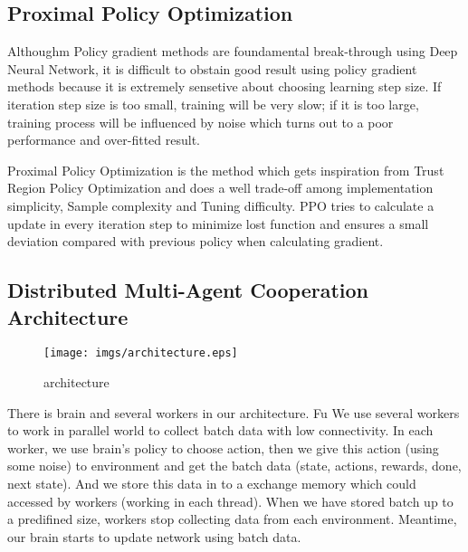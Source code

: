 \documentclass[11pt,twocolumn]{jarticle} %
\begin{document}
\subsection{Proximal Policy Optimization}
Althoughm Policy gradient methods are foundamental break-through using Deep Neural Network, it is difficult to obstain good result using policy gradient methods because it is extremely sensetive about choosing learning step size. If iteration step size is too small, training will be very slow; if it is too large, training process will be influenced by noise which turns out to a poor performance and over-fitted result. \par
Proximal Policy Optimization is the method which gets inspiration from Trust Region Policy Optimization and does a well trade-off among implementation simplicity, Sample complexity and Tuning difficulty. PPO tries to calculate a update in every iteration step to minimize lost function and ensures a small deviation compared with previous policy when calculating gradient.




\subsection{Distributed Multi-Agent Cooperation Architecture}
\begin{figure*}[t]
 \begin{center}
  \texttt{[image: imgs/architecture.eps]}
  \caption{architecture}
  \label{fig:architecture}
 \end{center}
\end{figure*}


There is brain and several workers in our architecture. Fu We use several workers to work in parallel world to collect batch data with low connectivity. In each worker,  we use brain's policy to choose action, then we give this action (using some noise) to environment and get the batch data (state, actions, rewards, done, next state). And we store this data in to a exchange memory which could accessed by workers (working in each thread). When we have stored batch up to a predifined size, workers stop collecting data from each environment. Meantime, our brain starts to update network using batch data.
\end{document}
